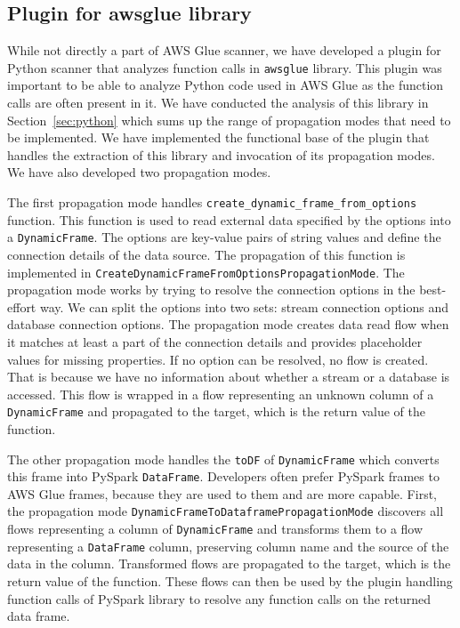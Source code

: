\subsection{Plugin for awsglue library}
While not directly a part of AWS Glue scanner, we have developed a plugin for Python scanner that analyzes function calls in \texttt{awsglue} library. This plugin was important to be able to analyze Python code used in AWS Glue as the function calls are often present in it. We have conducted the analysis of this library in Section~\ref{sec:python} which sums up the range of propagation modes that need to be implemented. We have implemented the functional base of the plugin that handles the extraction of this library and invocation of its propagation modes. We have also developed two propagation modes.
\par
The first propagation mode handles \texttt{create\_dynamic\_frame\_from\_options} function. This function is used to read external data specified by the options into a \texttt{DynamicFrame}. The options are key-value pairs of string values and define the connection details of the data source. The propagation of this function is implemented in  \texttt{CreateDynamicFrameFromOptionsPropagationMode}. The propagation mode works by trying to resolve the connection options in the best-effort way. We can split the options into two sets: stream connection options and database connection options. The propagation mode creates data read flow when it matches at least a part of the connection details and provides placeholder values for missing properties. If no option can be resolved, no flow is created. That is because we have no information about whether a stream or a database is accessed. This flow is wrapped in a flow representing an unknown column of a \texttt{DynamicFrame} and propagated to the target, which is the return value of the function.
\par
The other propagation mode handles the \texttt{toDF} of \texttt{DynamicFrame} which converts this frame into PySpark \texttt{DataFrame}. Developers often prefer PySpark frames to AWS Glue frames, because they are used to them and are more capable. First, the propagation mode \texttt{DynamicFrameToDataframePropagationMode} discovers all flows representing a column of \texttt{DynamicFrame} and transforms them to a flow representing a \texttt{DataFrame} column, preserving column name and the source of the data in the column. Transformed flows are propagated to the target, which is the return value of the function. These flows can then be used by the plugin handling function calls of PySpark library to resolve any function calls on the returned data frame.

 

 